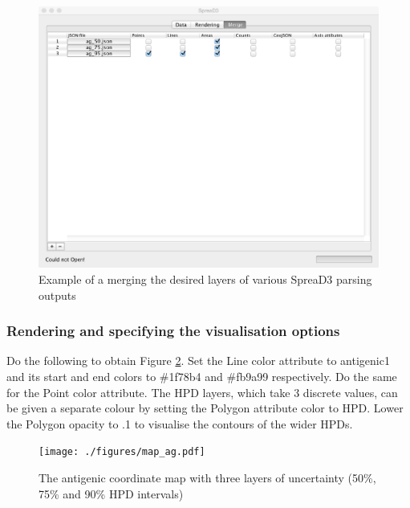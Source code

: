 \documentclass[english]{paper}
\def \spreadname {SpreaD3}
\begin{document}
\begin{figure}%
\centering
\includegraphics[width=1\textwidth]{./figures/new_merge_ag.pdf} 
\caption{Example of a merging the desired layers of various {\spreadname} parsing outputs}
\label{fig:mergeTipsTricks2}
\end{figure}

\subsubsection{Rendering and specifying the visualisation options}

Do the following to obtain Figure \ref{fig:mergeTipsTricks}.
Set the Line color attribute to antigenic1 and its start and end colors to \#1f78b4 and \#fb9a99 respectively. 
Do the same for the Point color attribute.
The HPD layers, which take 3 discrete values, can be given a separate colour by setting the Polygon attribute color to HPD.
Lower the Polygon opacity to .1 to visualise the contours of the wider HPDs.

\begin{figure}%
\centering
\texttt{[image: ./figures/map\_ag.pdf]} 
\caption{The antigenic coordinate map with three layers of uncertainty (50\%, 75\% and 90\% HPD intervals)}
\label{fig:mergeTipsTricks}
\end{figure}
\end{document}
